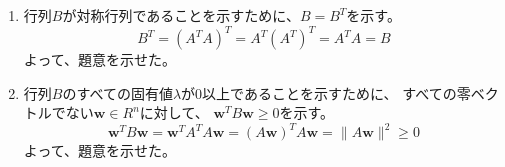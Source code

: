 \begin{enumerate}
  \item 行列\(B\)が対称行列であることを示すために、\(B = B^{T}\)を示す。
  \begin{equation}\label{equation:3_1_a}
    B^{T}
    = \left(A^{T} A\right)^{T}
    = A^{T} \left(A^{T}\right)^{T}
    = A^{T} A = B
  \end{equation}
  よって、題意を示せた。\\

  \item 行列\(B\)のすべての固有値\(\lambda\)が0以上であることを示すために、
  すべての零ベクトルでない\(\bm{w} \in R^{n}\)に対して、
  \(\bm{w}^{T} B \bm{w} \geq 0\)を示す。
  \begin{equation}\label{equation:3_2_a}
    \bm{w}^{T} B \bm{w}
    = \bm{w}^{T} A^{T} A \bm{w}
    = \left(A \bm{w}\right)^{T} A \bm{w}
    = \|A \bm{w}\|^{2}
    \geq 0
  \end{equation}
  よって、題意を示せた。\\


\end{enumerate}
